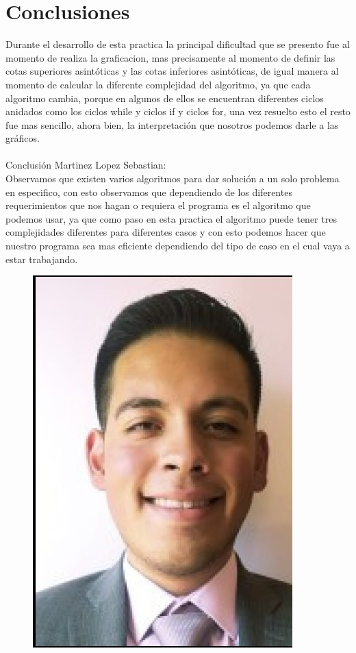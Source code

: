 \documentclass[12pt,twoside]{article}
\begin{document}
\section{Conclusiones}
Durante el desarrollo de esta practica la principal dificultad que se presento fue al momento de realiza la graficacion, mas precisamente al momento de definir las cotas superiores asintóticas y las cotas inferiores asintóticas, de igual manera al momento de calcular la diferente complejidad del algoritmo, ya que cada algoritmo cambia, porque en algunos de ellos se encuentran diferentes ciclos anidados como los ciclos while y ciclos if y ciclos for, una vez resuelto esto el resto fue mas sencillo, ahora bien, la interpretación que nosotros podemos darle a las gráficos.
\\
\\
Conclusión Martinez Lopez Sebastian:\\
Observamos que existen varios algoritmos para dar solución a un solo problema en especifico, con esto observamos que dependiendo de los diferentes requerimientos que nos hagan o requiera el programa es el algoritmo que podemos usar, ya que como paso en esta practica el algoritmo puede tener tres complejidades diferentes para diferentes casos y con esto podemos hacer que nuestro programa sea mas eficiente dependiendo del tipo de caso en el cual vaya a estar trabajando. 
\begin{figure}[h!]
\centering
\includegraphics[scale=0.2]{seb1.jpg}
\caption{}
\label{fig:universe}
\end{figure}
\end{document}
